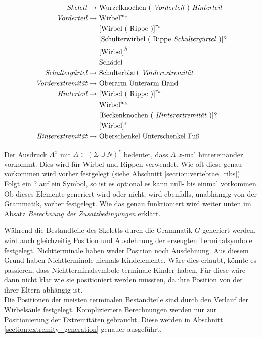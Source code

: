 \begin{align*}
 \text{\emph{Skelett}} \rightarrow &\text{ Wurzelknochen ( \emph{Vorderteil} ) \emph{Hinterteil}}\\
 \text{\emph{Vorderteil}} \rightarrow &\text{ Wirbel}^{w_v}\\
    &\text{ [Wirbel ( Rippe )]}^{r_v}\\
    &\text{ [Schulterwirbel ( Rippe \emph{Schultergürtel} )]?}\\
    &\text{ [Wirbel]}^h\\
    &\text{ Schädel}\\
 \text{\emph{Schultergürtel}} \rightarrow &\text{ Schulterblatt \emph{Vorderextremität}}\\
 \text{\emph{Vorderextremität}} \rightarrow &\text{ Oberarm Unterarm Hand}\\
 \text{\emph{Hinterteil}} \rightarrow &\text{ [Wirbel ( Rippe )]}^{r_h}\\
    &\text{ Wirbel}^{w_h}\\
    &\text{ [Beckenknochen ( \emph{Hinterextremität} )]?}\\
    &\text{ [Wirbel]}^s\\
 \text{\emph{Hinterextremität}} \rightarrow &\text{ Oberschenkel Unterschenkel Fuß}
\end{align*}

Der Ausdruck $A^x$ mit $A \in (\Sigma \cup N)^*$ bedeutet, dass $A$ $x$-mal hintereinander vorkommt. Dies wird für Wirbel und Rippen verwendet. Wie oft diese genau vorkommen wird vorher festgelegt (siehe Abschnitt \ref{section:vertebrae_ribs}).
Folgt ein ? auf ein Symbol, so ist es optional \dash es kann null- bis einmal vorkommen. Ob dieses Elemente generiert wird oder nicht, wird ebenfalls, unabhängig von der Grammatik, vorher festgelegt. Wie das genau funktioniert wird weiter unten im Absatz \emph{Berechnung der Zusatzbedingungen} erklärt.

Während die Bestandteile des Skeletts durch die Grammatik $G$ generiert werden, wird auch gleichzeitig Position und Ausdehnung der erzeugten Terminalsymbole festgelegt. Nichtterminale haben weder Position noch Ausdehnung. Aus diesem Grund haben Nichtterminale niemals Kindelemente. Wäre dies erlaubt, könnte es passieren, dass Nichtterminalsymbole terminale Kinder haben. Für diese wäre dann nicht klar wie sie positioniert werden müssten, da ihre Position von der ihrer Eltern abhängig ist.\\
Die Positionen der meisten terminalen Bestandteile sind durch den Verlauf der Wirbelsäule festgelegt. Kompliziertere Berechnungen werden nur zur Positionierung der Extremitäten gebraucht. Diese werden in Abschnitt \ref{section:extremity_generation} genauer ausgeführt.



